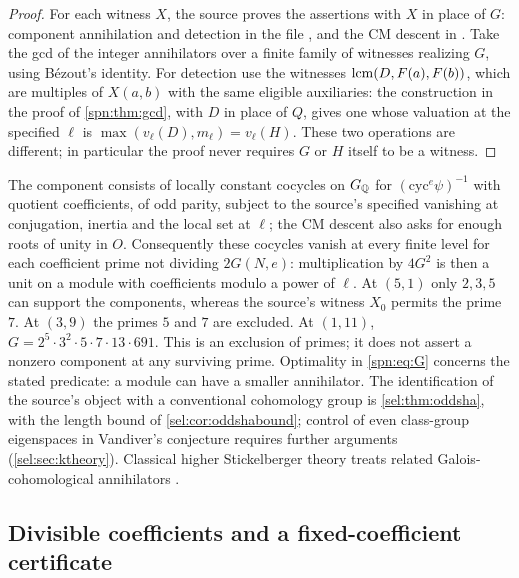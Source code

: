 \begin{proof}
For each witness $X$, the source proves the assertions with $X$ in place of
$G$: component annihilation and detection in the file
, and the CM descent in
. Take the gcd of the integer annihilators over a finite
family of witnesses realizing $G$, using B\'ezout's identity. For detection
use the witnesses $\operatorname{lcm}(D,F(a),F(b))$, which are multiples of $X(a,b)$ with
the same eligible auxiliaries: the construction in the proof of
\cref{spn:thm:gcd}, with $D$ in place of $Q$, gives one whose valuation at
the specified $\ell$ is $\max(v_\ell(D),m_\ell)=v_\ell(H)$. These two
operations are different; in particular the proof never requires $G$ or $H$
itself to be a witness.
\end{proof}

The component consists of locally constant cocycles on $G_{\mathbb{Q}}$ for
$(\mathrm{cyc}^e\psi)^{-1}$ with quotient coefficients, of odd parity,
subject to the source's specified vanishing at conjugation, inertia and the
local set at $\ell$; the CM descent also asks for enough roots of unity in
$O$. Consequently these cocycles vanish at every finite level for each
coefficient prime not dividing $2G(N,e)$: multiplication by $4G^2$ is then a
unit on a module with coefficients modulo a power of $\ell$. At $(5,1)$ only
$2,3,5$ can support the components, whereas the source's witness $X_0$
permits the prime $7$. At $(3,9)$ the primes $5$ and $7$ are excluded. At
$(1,11)$, $G=2^5\cdot3^2\cdot5\cdot7\cdot13\cdot691$. This is an exclusion of
primes; it does not assert a nonzero component at any surviving prime.
Optimality in \eqref{spn:eq:G} concerns the stated predicate: a module can
have a smaller annihilator. The identification of the source's object with a
conventional cohomology group is \cref{sel:thm:oddsha}, with the length bound
of \cref{sel:cor:oddshabound}; control of even class-group eigenspaces in
Vandiver's conjecture requires further arguments (\cref{sel:sec:ktheory}). Classical
higher Stickelberger theory treats related Galois-cohomological annihilators
\cite{Banaszak2003Higher}.


\subsection{Divisible coefficients and a fixed-coefficient certificate}\label{sel:sec:quantifiers}

